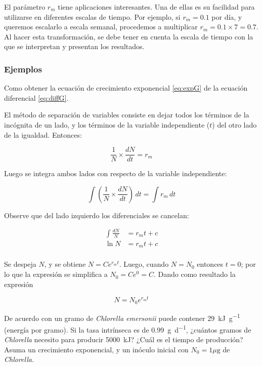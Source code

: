 \documentclass[12pt,letterpaper,]{book}
\let\BeginKnitrBlock\begin \let\EndKnitrBlock\end
\begin{document}
El parámetro \(r_m\) tiene aplicaciones interesantes. Una de ellas es su
facilidad para utilizarse en diferentes escalas de tiempo. Por ejemplo,
si \(r_m = 0.1\) por día, y queremos escalarlo a escala semanal,
procedemos a multiplicar \(r_m = 0.1 \times 7 = 0.7\). Al hacer esta
transformación, se debe tener en cuenta la escala de tiempo con la que
se interpretan y presentan los resultados.

\subsubsection{Ejemplos}\label{ejemplos-1}

\BeginKnitrBlock{example}
\protect\hypertarget{exm:exp1}{}{\label{exm:exp1} } Como obtener la ecuación
de crecimiento exponencial \eqref{eq:expG} de la ecuación diferencial
\eqref{eq:diffG}.
\EndKnitrBlock{example}

El método de separación de variables consiste en dejar todos los
términos de la incógnita de un lado, y los términos de la variable
independiente (\(t\)) del otro lado de la igualdad. Entonces:

\[
\frac{1}{N} \times \frac{dN}{dt}=r_m
\]

Luego se integra ambos lados con respecto de la variable independiente:

\[
\int \left( \frac{1}{N} \times \frac{dN}{dt}\right)\,dt=\int r_m\,dt
\]

Observe que del lado izquierdo los diferenciales se cancelan:

\begin{equation*}
\begin{split}
\int \frac{dN}{N}&=r_m t + c\\
\ln N & = r_m t + c\\
\end{split}
\end{equation*}

Se despeja \(N\), y se obtiene \(N=Ce^{r_m t}\). Luego, cuando \(N=N_0\)
entonces \(t=0\); por lo que la expresión se simplifica a
\(N_0 = C e^0 = C\). Dando como resultado la expresión

\[
N = N_0 e^{r_m t}
\]

\BeginKnitrBlock{example}
\protect\hypertarget{exm:exp2}{}{\label{exm:exp2} }De acuerdo con
\citet{ILLMAN2000631} un gramo de \emph{Chlorella emersonii} puede
contener \SI{29}{\kilo\joule\per\gram} (energía por gramo). Si la tasa
intrínseca es de \SI{0.99}{\gram\per\day}, ¿cuántos gramos de
\emph{Chlorella} necesito para producir \SI{5000}{\kilo\joule}? ¿Cuál es
el tiempo de producción? Asuma un crecimiento exponencial, y un inóculo
inicial con \(N_0 = 1\mu \si{\gram}\) de \emph{Chlorella}.
\EndKnitrBlock{example}
\end{document}
